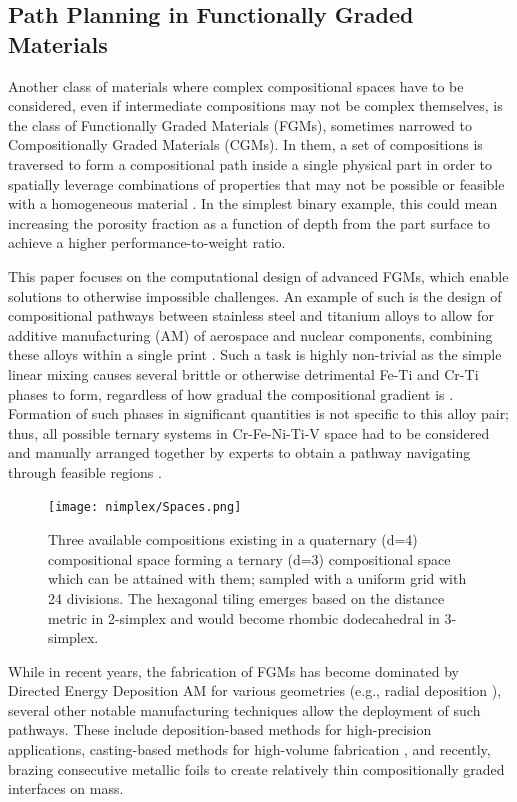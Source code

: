 \subsection{Path Planning in Functionally Graded Materials} \label{nimplex:ssec:functionallygraded}

Another class of materials where complex compositional spaces have to be considered, even if intermediate compositions may not be complex themselves, is the class of Functionally Graded Materials (FGMs), sometimes narrowed to Compositionally Graded Materials (CGMs). In them, a set of compositions is traversed to form a compositional path inside a single physical part in order to spatially leverage combinations of properties that may not be possible or feasible with a homogeneous material \cite{Saleh202030Challenges}. In the simplest binary example, this could mean increasing the porosity fraction as a function of depth from the part surface to achieve a higher performance-to-weight ratio. 

This paper focuses on the computational design of advanced FGMs, which enable solutions to otherwise impossible challenges. An example of such is the design of compositional pathways between stainless steel and titanium alloys to allow for additive manufacturing (AM) of aerospace and nuclear components, combining these alloys within a single print \cite{Bobbio2022DesignCompositions}. Such a task is highly non-trivial as the simple linear mixing causes several brittle or otherwise detrimental Fe-Ti and Cr-Ti phases to form, regardless of how gradual the compositional gradient is \cite{Reichardt2016DevelopmentManufacturing}. Formation of such phases in significant quantities is not specific to this alloy pair; thus, all possible ternary systems in Cr-Fe-Ni-Ti-V space had to be considered and manually arranged together by experts to obtain a pathway navigating through feasible regions \cite{Bobbio2022DesignCompositions}.


\begin{figure}[H]
    \centering
    \texttt{[image: nimplex/Spaces.png]}
    \caption{Three available compositions existing in a quaternary (d=4) compositional space forming a ternary (d=3) compositional space which can be attained with them; sampled with a uniform grid with 24 divisions. The hexagonal tiling emerges based on the distance metric in 2-simplex and would become rhombic dodecahedral in 3-simplex.} 
    \label{nimplex:fig:fgmspaces}
\end{figure}

While in recent years, the fabrication of FGMs has become dominated by Directed Energy Deposition AM for various geometries (e.g., radial deposition \cite{Hofmann2014DevelopingManufacturing}), several other notable manufacturing techniques allow the deployment of such pathways. These include deposition-based methods for high-precision applications, casting-based methods for high-volume fabrication \cite{Saleh202030Challenges}, and recently, brazing consecutive metallic foils \cite{Wu2023ATechnology} to create relatively thin compositionally graded interfaces on mass.

